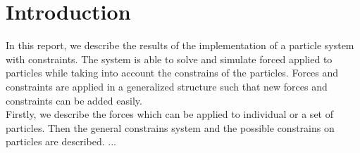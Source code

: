 \section{Introduction}
In this report, we describe the results of the implementation of a particle system with constraints. The system is able to solve and simulate forced applied to particles while taking into account the constrains of the particles. Forces and constraints are applied in a generalized structure such that new forces and constraints can be added easily.\\
Firstly, we describe the forces which can be applied to individual or a set of particles. Then the general constrains system and the possible constrains on particles are described. ...